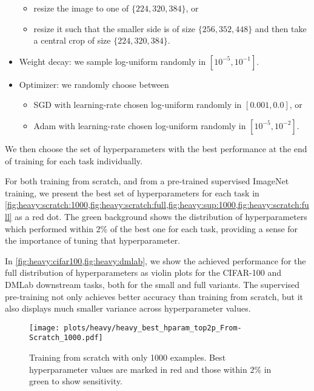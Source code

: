 \documentclass{article}
\newcommand{\imagenet}{ImageNet}
\begin{document}
\begin{itemize}
    \begin{itemize}
        \item resize the image to one of $\{224,\allowbreak 320,\allowbreak 384\}$, or
        \item resize it such that the smaller side is of size $\{256,\allowbreak 352,\allowbreak 448\}$ and then take a central crop of size $\{224,\allowbreak 320,\allowbreak 384\}$.
    \end{itemize}
    \item Weight decay: we sample log-uniform randomly in $[10^{-5}, 10^{-1}]$.
    \item Optimizer: we randomly choose between
    \begin{itemize}
        \item SGD with learning-rate chosen log-uniform randomly in $[0.001, 0.0]$, or
        \item Adam with learning-rate chosen log-uniform randomly in $[10^{-5}, 10^{-2}]$.
    \end{itemize}
\end{itemize}
We then choose the set of hyperparameters with the best performance at the end of training for each task individually.

For both training from scratch, and from a pre-trained supervised \imagenet{} training, we present the best set of hyperparameters for each task in \cref{fig:heavy:scratch:1000,fig:heavy:scratch:full,fig:heavy:sup:1000,fig:heavy:scratch:full} as a red dot.
The green background shows the distribution of hyperparameters which performed within 2\% of the best one for each task, providing a sense for the importance of tuning that hyperparameter.

In \cref{fig:heavy:cifar100,fig:heavy:dmlab}, we show the achieved performance for the full distribution of hyperparameters as violin plots for the CIFAR-100 and DMLab downstream tasks, both for the small and full variants.
The supervised pre-training not only achieves better accuracy than training from scratch, but it also displays much smaller variance across hyperparameter values.
\clearpage

\begin{figure}[!h]
\centering
\texttt{[image: plots/heavy/heavy\_best\_hparam\_top2p\_From-Scratch\_1000.pdf]}
\caption{Training from scratch with only 1000 examples. Best hyperparameter values are marked in red and those within $2\%$ in green to show sensitivity.}\label{fig:heavy:scratch:1000}
\end{figure}
\end{document}
